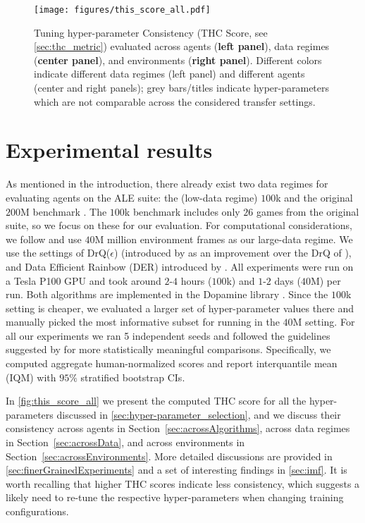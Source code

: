 \begin{figure}[!t]
    \centering
  \texttt{[image: figures/this\_score\_all.pdf]}%
    \caption{Tuning hyper-parameter Consistency (THC Score, see \cref{sec:thc_metric}) evaluated across agents (\textbf{left panel}), data regimes (\textbf{center panel}), and environments  (\textbf{right panel}). Different colors indicate different data regimes (left panel) and different agents (center and right panels); grey bars/titles indicate hyper-parameters which are not comparable across the considered transfer settings.
    \label{fig:this_score_all}%
    }%
\end{figure}



\section{Experimental results} 
\label{exp_results}
As mentioned in the introduction, there already exist two data regimes for evaluating agents on the ALE suite: the (low-data regime) $100$k \citep{kaiser2020modelbased} and the original $200$M benchmark \citep{mnih2015humanlevel}. The $100$k benchmark includes only $26$ games from the original suite, so we focus on these for our evaluation. For computational considerations, we follow \citet{graesser2022state} and use $40$M million environment frames as our large-data regime.
We use the settings of DrQ($\epsilon$) (introduced by \citet{agarwal2021deep} as an improvement over the DrQ of \citet{yarats2021image}), and 
Data Efficient Rainbow (DER) introduced by \citet{hasselt19when}. All experiments were run on a Tesla P100 GPU and took around $2$-$4$ hours ($100$k) and $1$-$2$ days ($40$M) per run.
Both algorithms are implemented in the Dopamine library \citep{castro18dopamine}. Since the $100$k setting is cheaper, we evaluated a larger set of hyper-parameter values there and manually picked the most informative subset for running in the $40$M setting. For all our experiments we ran 5 independent seeds and followed the guidelines suggested by \citet{agarwal2021deep} for more statistically meaningful comparisons. Specifically, we computed aggregate human-normalized scores and report interquantile mean (IQM) with $95\%$ stratified bootstrap CIs. 

In \autoref{fig:this_score_all} we present the computed THC score for all the hyper-parameters discussed in \cref{sec:hyper-parameter_selection}, and we discuss their consistency across agents in Section~\ref{sec:acrossAlgorithms}, across data regimes in Section~\ref{sec:acrossData}, and  across environments in Section~\ref{sec:acrossEnvironments}. More detailed discussions are provided in \autoref{sec:finerGrainedExperiments} and a set of interesting findings in \autoref{sec:imf}. It is worth recalling that higher THC scores indicate less consistency, which suggests a likely need to re-tune the respective hyper-parameters when changing training configurations.


